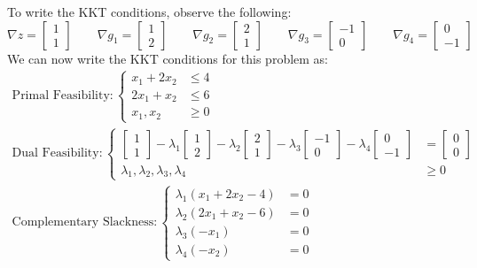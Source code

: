 To write the KKT conditions, observe the following:
\begin{equation}
\nabla z = \begin{bmatrix}1\\1\end{bmatrix} \quad \quad \nabla g_1 = \begin{bmatrix}1\\2\end{bmatrix}
\quad\quad \nabla g_2 = \begin{bmatrix}2\\1\end{bmatrix} \quad \quad 
\nabla g_3 = \begin{bmatrix}-1\\0\end{bmatrix} \quad \quad \nabla g_4 = \begin{bmatrix}0\\-1\end{bmatrix}
\end{equation}
We can now write the KKT conditions for this problem as:
\begin{gather*}
\text{Primal Feasibility}: \left\{
\begin{aligned}
x_1 + 2x_2 &\leq 4\\
2x_1 + x_2 &\leq 6\\
x_1, x_2 &\geq 0
\end{aligned}
\right.\\
\text{Dual Feasibility}:\left\{
\begin{aligned}
\begin{bmatrix}1\\1\end{bmatrix} - \lambda_1\begin{bmatrix}1\\2\end{bmatrix} - 
\lambda_2\begin{bmatrix}2\\1\end{bmatrix} -\lambda_3\begin{bmatrix}-1\\0\end{bmatrix} - 
\lambda_4\begin{bmatrix}0\\-1\end{bmatrix} &= \begin{bmatrix}0\\0\end{bmatrix}\\
\lambda_1,\lambda_2,\lambda_3,\lambda_4 & \geq 0
\end{aligned}
\right.\\
\text{Complementary Slackness}:\left\{
\begin{aligned}
\lambda_1(x_1 + 2x_2 -4) &= 0\\
\lambda_2(2x_1 + x_2 - 6) &= 0\\
\lambda_3(-x_1) &= 0\\
\lambda_4(-x_2) &= 0
\end{aligned}
\right.
\end{gather*}
